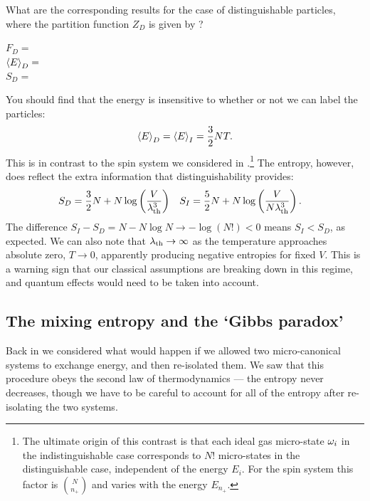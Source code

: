 \newpage %
What are the corresponding results for the case of distinguishable particles, where the partition function $Z_D$ is given by ?
\begin{mdframed}
  $\displaystyle F_D = $ \\[50 pt]
  $\displaystyle \left\langle E \right\rangle_D = $ \\[50 pt]
  $\displaystyle S_D = $ \\[50 pt]
\end{mdframed}
You should find that the energy is insensitive to whether or not we can label the particles:
\begin{equation}
  \label{eq:ideal_energy}
  \left\langle E \right\rangle_D = \left\langle E \right\rangle_I = \frac{3}{2} NT.
\end{equation}
This is in contrast to the spin system we considered in .\footnote{The ultimate origin of this contrast is that each ideal gas micro-state $\omega_i$ in the indistinguishable case corresponds to $N!$ micro-states in the distinguishable case, independent of the energy $E_i$.  For the spin system this factor is $\binom{N}{n_+}$ and varies with the energy $E_{n_+}$.}
The entropy, however, does reflect the extra information that distinguishability provides:
\begin{align}
  \label{eq:ideal_entropy}
  S_D & = \frac{3}{2} N + N \log\left(\frac{V}{\lambda_{\mathrm{th}}^3}\right) &
  S_I & = \frac{5}{2} N + N \log\left(\frac{V}{N\lambda_{\mathrm{th}}^3}\right).
\end{align}
The difference $S_I - S_D = N - N\log N \to -\log(N!) < 0$ means $S_I < S_D$, as expected.
We can also note that $\lambda_{\mathrm{th}} \to \infty$ as the temperature approaches absolute zero, $T \to 0$, apparently producing negative entropies for fixed $V$.
This is a warning sign that our classical assumptions are breaking down in this regime, and quantum effects would need to be taken into account.



\subsection{The mixing entropy and the `Gibbs paradox'}
Back in  we considered what would happen if we allowed two micro-canonical systems to exchange energy, and then re-isolated them.
We saw that this procedure obeys the second law of thermodynamics --- the entropy never decreases, though we have to be careful to account for all of the entropy after re-isolating the two systems.

